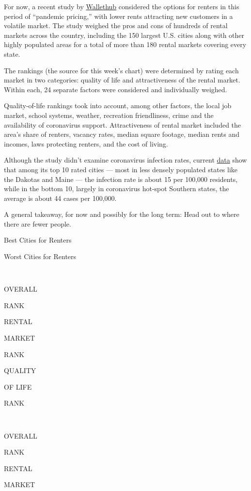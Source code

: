 For now, a recent study by
\href{https://wallethub.com/edu/best-cities-for-renters/23010/}{Wallethub}
considered the options for renters in this period of ``pandemic
pricing,'' with lower rents attracting new customers in a volatile
market. The study weighed the pros and cons of hundreds of rental
markets across the country, including the 150 largest U.S. cities along
with other highly populated areas for a total of more than 180 rental
markets covering every state.

The rankings (the source for this week's chart) were determined by
rating each market in two categories: quality of life and attractiveness
of the rental market. Within each, 24 separate factors were considered
and individually weighed.

Quality-of-life rankings took into account, among other factors, the
local job market, school systems, weather, recreation friendliness,
crime and the availability of coronavirus support. Attractiveness of
rental market included the area's share of renters, vacancy rates,
median square footage, median rents and incomes, laws protecting
renters, and the cost of living.

Although the study didn't examine coronavirus infection rates, current
\href{https://www.nytimes3xbfgragh.onion/interactive/2020/us/coronavirus-us-cases.html}{data}
show that among its top 10 rated cities --- most in less densely
populated states like the Dakotas and Maine --- the infection rate is
about 15 per 100,000 residents, while in the bottom 10, largely in
coronavirus hot-spot Southern states, the average is about 44 cases per
100,000.

A general takeaway, for now and possibly for the long term: Head out to
where there are fewer people.

Best Cities for Renters

Worst Cities for Renters

~

OVERALL

RANK

RENTAL

MARKET

RANK

QUALITY

OF LIFE

RANK

~

OVERALL

RANK

RENTAL

MARKET

